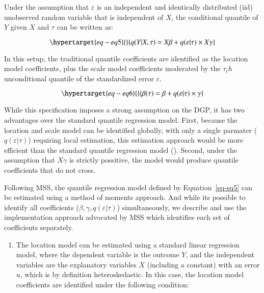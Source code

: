 \documentclass[
  authoryear,
  preprint,
  1p]{elsarticle}
\providecommand{\tightlist}{%
  \setlength{\itemsep}{0pt}\setlength{\parskip}{0pt}}\usepackage{longtable,booktabs,array}
\begin{document}
Under the assumption that \(\varepsilon\) is an independent and
identically distributed (iid) unobserved random variable that is
independent of \(X\), the conditional quantile of \(Y\) given \(X\) and
\(\tau\) can be written as:

\begin{equation}\protect\hypertarget{eq-eq5}{}{q(Y|X,\tau) =X\beta+q(\varepsilon|\tau) \times X\gamma 
}\label{eq-eq5}\end{equation}

In this setup, the traditional quantile coefficients are identified as
the location model coefficients, plus the scale model coefficients
moderated by the \(\tau_th\) unconditional quantile of the standardized
error \(\varepsilon\).

\begin{equation}\protect\hypertarget{eq-eq6}{}{\beta(\tau) = \beta + q(\varepsilon|\tau) \times \gamma 
}\label{eq-eq6}\end{equation}

While this specification imposes a strong assumption on the DGP, it has
two advantages over the standard quantile regression model. First,
because the location and scale model can be identified globally, with
only a single parmater (\(q(\varepsilon|\tau)\)) requiring local
estimation, this estimation approach would be more efficient than the
standard quantile regression model (\citet{zhao2000}). Second, under the
assumption that \(X\gamma\) is strictly possitive, the model would
produce quantile coefficients that do not cross.

Following MSS, the quantile regression model defined by
Equation~\ref{eq-eq5} can be estimated using a method of moments
approach. And while its possible to identify all coefficients
(\(\beta,\gamma, q(\varepsilon|\tau)\)) simultaneously, we describe and
use the implementation approach advocated by MSS which identifies each
set of coefficients separately.

\begin{enumerate}
\def\labelenumi{\arabic{enumi}.}
\tightlist
\item
  The location model can be estimated using a standard linear regression
  model, where the dependent variable is the outcome \(Y\), and the
  independent variables are the explanatory variables \(X\) (including a
  constant) with an error \(u\), which is by definition heteroskedastic.
  In this case, the location model coefficients are identified under the
  following condition:
\end{enumerate}
\end{document}
